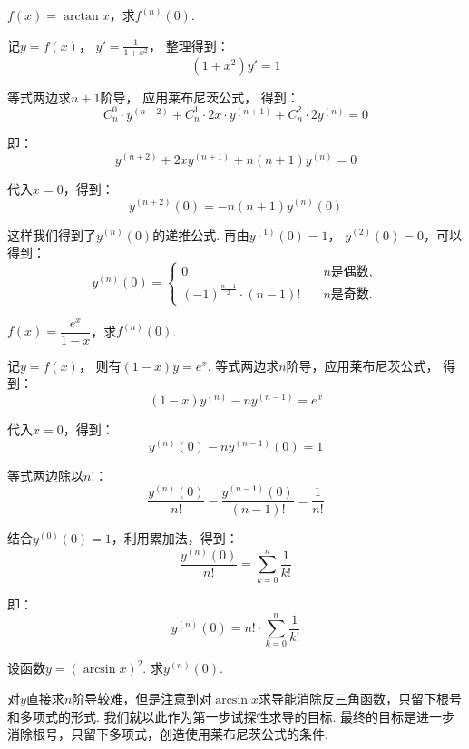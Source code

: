 \begin{example}
\label{ex:ch02-10}
$f(x) = \arctan x$，求$f^{(n)}(0)$.
\end{example}

\begin{solution}
记$y = f(x)$，
$y' = \frac{1}{1+x^2}$，
整理得到：
$$
(1 + x^2)y' = 1
$$

等式两边求$n+1$阶导，
应用莱布尼茨公式，
得到：
$$
C_{n}^{0} \cdot y^{(n+2)} + C_{n}^{1} \cdot 2x \cdot y^{(n+1)} + C_{n}^{2} \cdot 2 y^{(n)} = 0
$$

即：
$$
y^{(n+2)} + 2xy^{(n+1)} + n(n+1)y^{(n)} = 0
$$

代入$x = 0$，得到：
$$
y^{(n+2)}(0) =  -n(n+1)y^{(n)}(0)
$$

这样我们得到了$y^{(n)}(0)$的递推公式.
再由$y^{(1)}(0) = 1$，
$y^{(2)}(0) = 0$，可以得到：
$$
y^{(n)}(0) =
\begin{cases}
0 &\quad n \text{是偶数}, \\
(-1)^{\frac{n-1}{2}} \cdot (n-1)! &\quad n \text{是奇数}.
\end{cases}
$$
\end{solution}

\begin{example}
\label{ex:ch02-11}
$f(x) = \dfrac{e^x}{1-x}$，求$f^{(n)}(0)$.
\end{example}

\begin{solution}
记$y = f(x)$，
则有$(1-x)y = e^x$.
等式两边求$n$阶导，应用莱布尼茨公式，
得到：
$$
(1-x)y^{(n)} - n y^{(n-1)} = e^x
$$

代入$x = 0$，得到：
$$
y^{(n)}(0) - n y^{(n-1)}(0)  = 1
$$

等式两边除以$n!$：
$$
\frac{y^{(n)}(0)}{n!} - \frac{y^{(n-1)}(0)}{(n-1)!} = \frac{1}{n!}
$$

结合$y^{(0)}(0) = 1$，利用累加法，得到：
$$
\frac{y^{(n)}(0)}{n!} = \sum_{k=0}^{n} \frac{1}{k!}
$$

即：
$$
y^{(n)}(0) = n! \cdot \sum_{k=0}^{n} \frac{1}{k!}
$$
\end{solution}

\begin{example}
\label{ex:ch02-12}
设函数$y=(\arcsin x)^2$.
求$y^{(n)}(0)$.
\end{example}

\begin{analysis}
对$y$直接求$n$阶导较难，但是注意到对$\arcsin x$求导能消除反三角函数，只留下根号和多项式的形式.
我们就以此作为第一步试探性求导的目标.
最终的目标是进一步消除根号，只留下多项式，创造使用莱布尼茨公式的条件.
\end{analysis}

